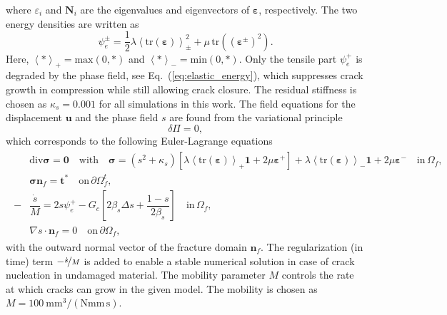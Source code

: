 \documentclass[
	pdflatex,
	sn-mathphys-num
]{sn-jnl}
\theoremstyle{thmstyleone}%
\theoremstyle{thmstyletwo}%
\theoremstyle{thmstylethree}%
\begin{document}
where $\varepsilon_i$ and $\boldsymbol{N}_i$ are the eigenvalues
and eigenvectors of $\boldsymbol{\varepsilon}$, respectively.
The two energy densities are written as
\begin{equation}
	\psi_e^{\pm} =
	\dfrac{1}{2}\lambda
	\left<\text{tr}\left(\boldsymbol{\varepsilon}\right)
	\right>_{\pm}^2
	+
	\mu\,\text{tr}
	\left(\left(\boldsymbol{\varepsilon}^{\pm}\right)^2\right).
\end{equation}
Here, $\left<*\right>_+ = \text{max}(0,*)$ and $\left<*\right>_-
	= \text{min}(0,*)$. Only the tensile part $\psi_e^+$ is degraded
by the phase field, see Eq.~(\ref{eq:elastic_energy}), which suppresses crack growth in compression
while still allowing crack closure. The residual stiffness is
chosen as $\kappa_s=0.001$ for all simulations in this work.
The field equations for the displacement $\boldsymbol{u}$ and
the phase field $s$ are found from the variational principle
\begin{equation}
	\delta{\Pi} = 0,
\end{equation}
which corresponds to the following Euler-Lagrange equations
\begin{align}
	\begin{split}
		&\text{div}\boldsymbol{\sigma}=\boldsymbol{0}
		\quad\text{with}\quad \boldsymbol{\sigma} =
		\left(s^2+\kappa_s\right)\left[
			\lambda\left<\text{tr}
			\left(\boldsymbol{\varepsilon}\right)\right>_+
			\boldsymbol{1}
			+ 2\mu\boldsymbol{\varepsilon}^+\right] +
		\lambda\left<\text{tr}
		\left(\boldsymbol{\varepsilon}\right)\right>_-
		\boldsymbol{1}
		+ 2\mu\boldsymbol{\varepsilon}^-\quad \text{in} \, \Omega_f, \\
		&{\boldsymbol{\sigma} \boldsymbol{n}_f =\boldsymbol{t}^*}
		\quad\text{on}\,\partial\Omega_f^t,\\
		-&\dfrac{\dot{s}}{M} =
		2s\psi_e^+-G_c
		\left[2\beta_s\Delta{s}
			+\dfrac{1-s}{2\beta_s}\right]
		\quad \text{in} \, \Omega_f, \\
		&\nabla{s}\cdot{\boldsymbol{n}_f} =
		0\quad\text{on}\,\partial\Omega_f,
	\end{split}
	\label{eq:field_equations}
\end{align}
with the outward normal vector of the fracture domain $\boldsymbol{n}_f$.
The regularization (in time) term $-\nicefrac{\dot{s}}{M}$ is
added to enable a stable numerical
solution in case of  crack nucleation in undamaged material. The
mobility parameter $M$ controls the rate at which cracks can
grow in the given model. The
mobility is chosen as
$M=\text{100}~\mathrm{mm}^3/(\mathrm{Nmm}\,\mathrm{s})$.
\end{document}
